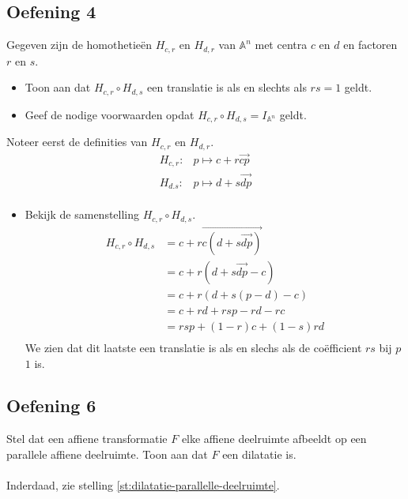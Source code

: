\documentclass[main.tex]{subfiles}
\begin{document}
\subsection*{Oefening 4}
Gegeven zijn de homothetie\"en $H_{c,r}$ en $H_{d,r}$ van $\mathbb{A}^{n}$ met centra $c$ en $d$ en factoren $r$ en $s$.
\begin{itemize}
\item Toon aan dat $H_{c,r} \circ H_{d,s}$ een translatie is als en slechts als $rs = 1$ geldt.
\item Geef de nodige voorwaarden opdat $H_{c,r} \circ H_{d,s} = I_{\mathbb{A}^{n}}$ geldt. 
\end{itemize}
Noteer eerst de definities van $H_{c,r}$ en $H_{d,r}$.
\[
\begin{array}{rl}
  H_{c,r}: & p \mapsto c + r\overrightarrow{cp}\\
  H_{d.s}: & p \mapsto d + s\overrightarrow{dp}\\ 
\end{array}
\]
\begin{itemize}
\item Bekijk de samenstelling $H_{c,r} \circ H_{d,s}$.
\[
\begin{array}{rl}
  H_{c,r} \circ H_{d,s} &= c + r\overrightarrow{c(d+s\overrightarrow{dp})}\\
                      &= c + r(d + s\overrightarrow{dp} - c)\\
                      &= c + r(d + s(p-d) -c)\\
                      &= c + rd + rsp -rd -rc \\
                      &= rsp + (1-r)c + (1-s)rd\\
\end{array}
\] 
We zien dat dit laatste een translatie is als en slechs als de co\"efficient $rs$ bij $p$ $1$ is.
\end{itemize}

\subsection*{Oefening 6}
Stel dat een affiene transformatie $F$ elke affiene deelruimte afbeeldt op een parallele affiene deelruimte.
Toon aan dat $F$ een dilatatie is.\\\\
Inderdaad, zie stelling \ref{st:dilatatie-parallelle-deelruimte}.
\end{document}

